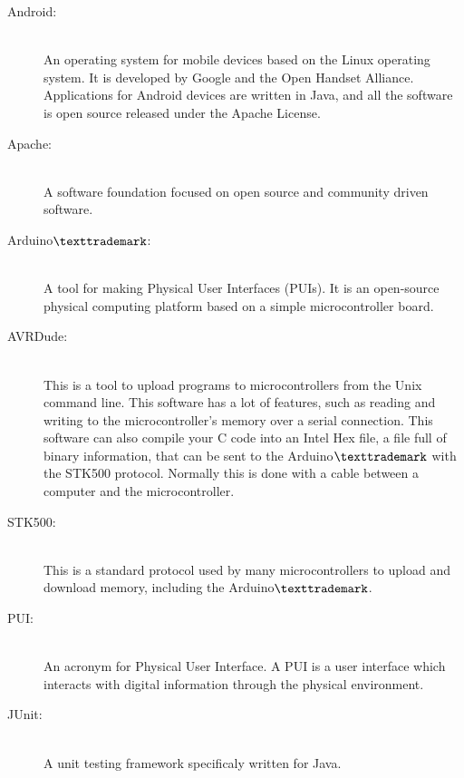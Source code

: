 \begin{description}

\item[Android:]\hfill \\
An operating system for mobile devices based on the Linux operating system. It is developed by Google and the Open Handset Alliance. Applications for Android devices are written in Java, and all the software is open source released under the Apache License.

\item[Apache:] \hfill \\
A software foundation focused on open source and community driven software.

\item[Arduino$\texttrademark$:]\hfill \\
A tool for making Physical User Interfaces (PUIs). It is an open-source physical computing platform based on a simple microcontroller board.

\item[AVRDude:]\hfill \\
This is a tool to upload programs to microcontrollers from the Unix command line. This software has a lot of features, such as reading and writing to the microcontroller's memory over a serial connection. This software can also compile your C code into an Intel Hex file, a file full of binary information, that can be sent to the Arduino$\texttrademark$ with the STK500 protocol. Normally this is done with a cable between a computer and the microcontroller.

\item[STK500:]\hfill \\
This is a standard protocol used by many microcontrollers to upload and download memory, including the Arduino$\texttrademark$.

\item[PUI:]\hfill \\
An acronym for Physical User Interface. A PUI is a user interface which interacts with digital information through the physical environment.

\item[JUnit:]\hfill \\
A unit testing framework specificaly written for Java.

\end{description}